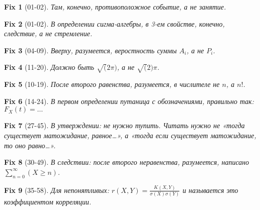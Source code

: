 \documentclass{article}
\newtheorem*{fix}{Fix}
\begin{document}
  \begin{fix}[01-02]
    Там, конечно, противоположное событие, а не занятие.
  \end{fix}

  \begin{fix}[01-02]
    В определении сигма-алгебры, в 3-ем свойстве, конечно, следствие, а не стремление.
  \end{fix}

  \begin{fix}[04-09]
    Вверху, разумеется, веростность суммы \(A_i\), а не \(P_i\).
  \end{fix}

  \begin{fix}[11-20]
    Должно быть \(\sqrt(2\pi)\), а не \(\sqrt(2)\pi\).
  \end{fix}

  \begin{fix}[10-19]
    После второго равенства, разумеется, в числителе не \(n\), а \(n!\).
  \end{fix}

  \begin{fix}[14-24]
    В первом определении путаница с обозначениями, правильно так: \(F_X(t) = \ldots\)
  \end{fix}

  \begin{fix}[27-45]
    В утверждении: не нужно тупить. Читать нужно не «тогда существует матожидание, равное…», а «тогда если существует матожидание, то оно равно…».
  \end{fix}

  \begin{fix}[30-49]
    В следствии: после второго неравенства, разумеется, написано \(\sum\limits_{n=0}^{\infty}(X \ge n)\).
  \end{fix}

  \begin{fix}[35-58]
    Для непонятливых: \(r(X, Y) = \frac{K(X, Y)}{\sigma(X) \sigma(Y)}\) и называется это коэффициентом корреляции.
  \end{fix}
\end{document}
